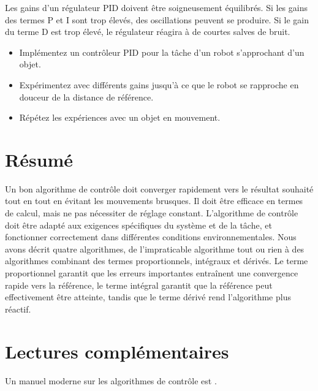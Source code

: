 Les gains d'un régulateur PID doivent être soigneusement équilibrés. Si les gains des termes P et I sont trop élevés, des oscillations peuvent se produire. Si le gain du terme D est trop élevé, le régulateur réagira à de courtes salves de bruit.


\begin{framed}
\begin{itemize}
\item Implémentez un contrôleur PID pour la tâche d'un robot s'approchant d'un objet.
\item Expérimentez avec différents gains jusqu'à ce que le robot se rapproche en douceur de la distance de référence.
\item Répétez les expériences avec un objet en mouvement.
\end{itemize}
\end{framed}

\section{Résumé}

Un bon algorithme de contrôle doit converger rapidement vers le résultat souhaité tout en
tout en évitant les mouvements brusques. Il doit être efficace en termes de calcul, mais ne pas nécessiter de réglage constant. L'algorithme de contrôle doit être adapté aux exigences spécifiques du système et de la tâche, et fonctionner correctement dans différentes conditions environnementales. Nous avons décrit quatre algorithmes, de l'impraticable algorithme tout ou rien à des algorithmes combinant des termes proportionnels, intégraux et dérivés. Le terme proportionnel garantit que les erreurs importantes entraînent une convergence rapide vers la référence, le terme intégral garantit que la référence peut effectivement être atteinte, tandis que le terme dérivé rend l'algorithme plus réactif. 

\section{Lectures complémentaires}

Un manuel moderne sur les algorithmes de contrôle est \cite{astrom-murray}.

